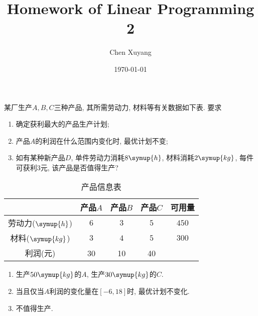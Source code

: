 \documentclass[chinese]{assignment}[2019/10/15]
\title{Homework of Linear Programming 2}
\author{Chen Xuyang}
\date{\today}
\institute{School of Mathematical Science}
\begin{document}
    \maketitle
    \begin{problem}\label{pr:1}
        某厂生产$A, B, C$三种产品, 其所需劳动力, 材料等有关数据如下表. 要求
        \begin{enumerate}[\hspace{2em}(1)]
            \item 确定获利最大的产品生产计划;
            \item 产品$A$的利润在什么范围内变化时, 最优计划不变;
            \item 如有某种新产品$D$, 单件劳动力消耗$8\symup{h}$, 材料消耗$2\symup{kg}$, 每件可获利$3$元, 该产品是否值得生产?
        \end{enumerate}
    \end{problem}
    \begin{table}[htb]
        \begin{center}
            \caption{产品信息表}
            \begin{tabular}{|c|c|c|c|c|}
                \hline
                & 产品$A$ & 产品$B$ & 产品$C$ & 可用量\\
                \hline
                劳动力($\symup{h}$) & $6$ & $3$ & $5$ & $450$\\
                \hline
                材料($\symup{kg}$) & $3$ & $4$ & $5$ & $300$\\
                \hline
                利润(元) & 30 & 10 & 40 & \\
                \hline
            \end{tabular}
        \end{center}
    \end{table}
    \begin{solution}\hspace{\fill}
        \begin{enumerate}[\hspace{2em}(1)]
            \item 生产$50\symup{kg}$的$A$, 生产$30\symup{kg}$的$C$.
            \item 当且仅当$A$利润的变化量在$[-6, 18]$时, 最优计划不变化.
            \item 不值得生产.
        \end{enumerate}
    \end{solution}
\end{document}
